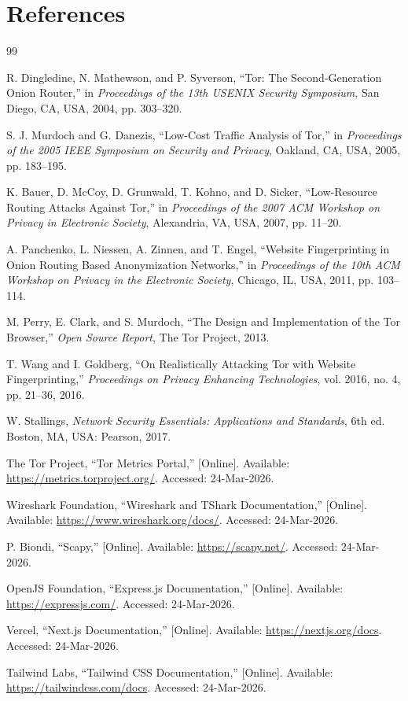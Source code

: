 \documentclass[12pt,a4paper]{report}
\begin{document}
\chapter*{References}
\begin{thebibliography}{99}

R. Dingledine, N. Mathewson, and P. Syverson, ``Tor: The Second-Generation Onion Router,'' in \textit{Proceedings of the 13th USENIX Security Symposium}, San Diego, CA, USA, 2004, pp. 303--320.

S. J. Murdoch and G. Danezis, ``Low-Cost Traffic Analysis of Tor,'' in \textit{Proceedings of the 2005 IEEE Symposium on Security and Privacy}, Oakland, CA, USA, 2005, pp. 183--195.

K. Bauer, D. McCoy, D. Grunwald, T. Kohno, and D. Sicker, ``Low-Resource Routing Attacks Against Tor,'' in \textit{Proceedings of the 2007 ACM Workshop on Privacy in Electronic Society}, Alexandria, VA, USA, 2007, pp. 11--20.

A. Panchenko, L. Niessen, A. Zinnen, and T. Engel, ``Website Fingerprinting in Onion Routing Based Anonymization Networks,'' in \textit{Proceedings of the 10th ACM Workshop on Privacy in the Electronic Society}, Chicago, IL, USA, 2011, pp. 103--114.

M. Perry, E. Clark, and S. Murdoch, ``The Design and Implementation of the Tor Browser,'' \textit{Open Source Report}, The Tor Project, 2013.

T. Wang and I. Goldberg, ``On Realistically Attacking Tor with Website Fingerprinting,'' \textit{Proceedings on Privacy Enhancing Technologies}, vol. 2016, no. 4, pp. 21--36, 2016.

W. Stallings, \textit{Network Security Essentials: Applications and Standards}, 6th ed. Boston, MA, USA: Pearson, 2017.

The Tor Project, ``Tor Metrics Portal,'' [Online]. Available: \url{https://metrics.torproject.org/}. Accessed: 24-Mar-2026.

Wireshark Foundation, ``Wireshark and TShark Documentation,'' [Online]. Available: \url{https://www.wireshark.org/docs/}. Accessed: 24-Mar-2026.

P. Biondi, ``Scapy,'' [Online]. Available: \url{https://scapy.net/}. Accessed: 24-Mar-2026.

OpenJS Foundation, ``Express.js Documentation,'' [Online]. Available: \url{https://expressjs.com/}. Accessed: 24-Mar-2026.

Vercel, ``Next.js Documentation,'' [Online]. Available: \url{https://nextjs.org/docs}. Accessed: 24-Mar-2026.

Tailwind Labs, ``Tailwind CSS Documentation,'' [Online]. Available: \url{https://tailwindcss.com/docs}. Accessed: 24-Mar-2026.

\end{thebibliography}
\end{document}
